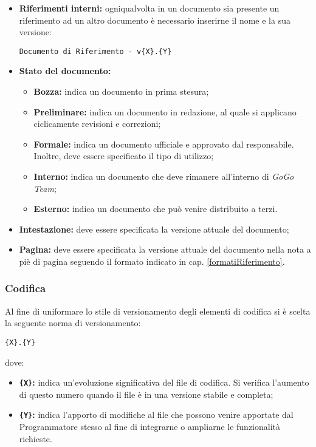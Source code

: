 {{{\begin{itemize}
\begin{itemize}
				\item \textbf{Riferimenti interni:} ogniqualvolta  in un documento sia presente un riferimento ad un altro documento è necessario inserirne il  nome e la sua versione: 
				\begin{center}
					\texttt{Documento di Riferimento - v\{X\}.\{Y\}}
				\end{center}
				\item \textbf{Stato del documento:}
					\begin{itemize}
						\item {\textbf{Bozza:} indica un documento in prima stesura;}
						\item {\textbf{Preliminare:} indica un documento in redazione, al quale si applicano ciclicamente revisioni e correzioni;}
						\item {\textbf{Formale:} indica un documento ufficiale e approvato dal responsabile.}
			Inoltre, deve essere specificato il tipo di utilizzo;
						\item {\textbf{Interno:} indica un documento che deve rimanere all'interno di \textit{GoGo Team};} 
						\item {\textbf{Esterno:} indica un documento che può venire distribuito a terzi.}
					\end{itemize}
				\item \textbf{Intestazione:} deve essere specificata la versione attuale del documento;
				\item \textbf{Pagina:} deve essere specificata la versione attuale del documento nella nota a piè di pagina seguendo il formato indicato in cap. \ref{formatiRiferimento}.
			\end{itemize}
		\end{itemize}		
	}
	}%


\subsubsection{Codifica}\label{versCod}{
	Al fine di uniformare lo stile di versionamento degli elementi di codifica si è scelta la seguente norma di versionamento:
	\begin{center}
		\texttt{\{X\}.\{Y\}}
	\end{center}
dove:
\begin{itemize}
				\item \textbf{\texttt{\{X\}}:} indica un'evoluzione significativa del file di codifica. Si verifica l'aumento di questo numero quando il file è in una versione stabile e completa;
				\item \textbf{\texttt{\{Y\}}:} indica l'apporto di modifiche al file che possono venire apportate dal Programmatore stesso al fine di integrarne o ampliarne le funzionalità richieste.
\end{itemize}
}%


}
